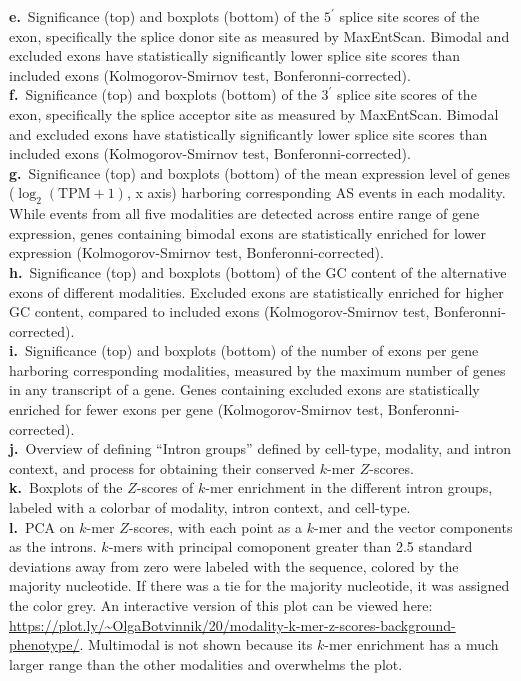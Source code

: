 \textbf{e.}~Significance (top) and boxplots (bottom) of the $5^\prime$ splice site scores of the exon, specifically the splice donor site as measured by MaxEntScan. Bimodal and excluded exons have statistically significantly lower splice site scores than included exons (Kolmogorov-Smirnov test, Bonferonni-corrected).\\
\textbf{f.}~Significance (top) and boxplots (bottom) of the $3^\prime$ splice site scores of the exon, specifically the splice acceptor site as measured by MaxEntScan. Bimodal and excluded exons have statistically significantly lower splice site scores than included exons (Kolmogorov-Smirnov test, Bonferonni-corrected).\\
\textbf{g.}~Significance (top) and boxplots (bottom) of the mean expression level of genes ($\log_2(\mathrm{TPM}+1)$, x axis) harboring corresponding AS events in each modality. While events from all five modalities are detected across entire range of gene expression, genes containing bimodal exons are statistically enriched for lower expression (Kolmogorov-Smirnov test, Bonferonni-corrected).\\
\textbf{h.}~Significance (top) and boxplots (bottom) of the GC content of the alternative exons of different modalities. Excluded exons are statistically enriched for higher GC content, compared to included exons (Kolmogorov-Smirnov test, Bonferonni-corrected).\\
\textbf{i.}~Significance (top) and boxplots (bottom) of the number of exons per gene harboring corresponding modalities, measured by the maximum number of genes in any transcript of a gene. Genes containing excluded exons are statistically enriched for fewer exons per gene (Kolmogorov-Smirnov test, Bonferonni-corrected).\\
\textbf{j.}~Overview of defining ``Intron groups'' defined by cell-type, modality, and intron context, and process for obtaining their conserved $k$-mer $Z$-scores.\\
\textbf{k.}~Boxplots of the $Z$-scores of $k$-mer enrichment in the different intron groups, labeled with a colorbar of modality, intron context, and cell-type.\\
\textbf{l.}~PCA on $k$-mer $Z$-scores, with each point as a $k$-mer and the vector components as the introns. $k$-mers with principal comoponent greater than 2.5 standard deviations away from zero were labeled with the sequence, colored by the majority nucleotide. If there was a tie for the majority nucleotide, it was assigned the color grey. An interactive version of this plot can be viewed here: \url{https://plot.ly/~OlgaBotvinnik/20/modality-k-mer-z-scores-background-phenotype/}. Multimodal is not shown because its $k$-mer enrichment has a much larger range than the other modalities and overwhelms the plot.\\
